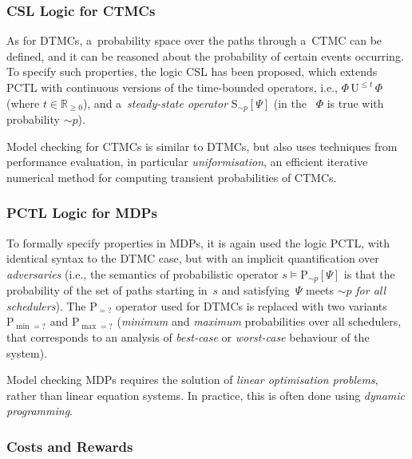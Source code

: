 \documentclass[a4paper, 11pt]{article}
\theoremstyle{definition}
\begin{document}
\subsubsection{CSL Logic for CTMCs}

As for DTMCs, a~probability space over the paths through a~CTMC can be
defined, and it can be reasoned about the probability of certain events
occurring. To specify such properties, the logic CSL has been
proposed, which extends PCTL with continuous versions of the time-bounded
operators, i.e., $ \Phi\,\mathrm{U}^{\leq t}\,\Phi $ (where $ t \in
\mathbb{R}_{\geq 0} $), and a~\emph{steady-state operator}
$ \mathrm{S}_{\sim\!p} [\Psi] $ (in the ~$ \Phi $ is true
with probability $ \sim\!p $).

Model checking for CTMCs is similar to DTMCs, but also uses techniques
from performance evaluation, in particular \emph{uniformisation}, an
efficient iterative numerical method for computing transient probabilities
of CTMCs.

\subsubsection{PCTL Logic for MDPs}

To formally specify properties in MDPs, it is again used the logic PCTL,
with identical syntax to the DTMC case, but with an implicit quantification
over \emph{adversaries} (i.e., the semantics of probabilistic operator $ s
\models \mathrm{P}_{\sim\!p} [\Psi] $ is that the probability of the set
of paths starting in~$ s $ and satisfying~$ \Psi $ meets $ \sim\!p $
\emph{for all schedulers}). The $ \mathrm{P}_{= ?} $ operator used for
DTMCs is replaced with two variants $ \mathrm{P}_{\min = ?} $ and
$ \mathrm{P}_{\max = ?} $ (\emph{minimum} and \emph{maximum} probabilities
over all schedulers, that corresponds to an analysis of \emph{best-case}
or \emph{worst-case} behaviour of the system).

Model checking MDPs requires the solution of \emph{linear optimisation
problems}, rather than linear equation systems. In practice, this is often
done using \emph{dynamic programming}.

\subsubsection{Costs and Rewards}
\end{document}
